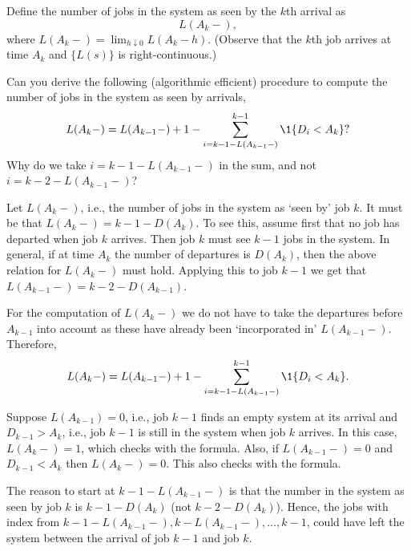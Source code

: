 \begin{exercise} 
Define the number of jobs in the system as seen by the $k$th arrival  as
\begin{equation}
  \label{eq:Lk}
  L(A_k-),
\end{equation}
where $L(A_k-) = \lim_{h\downarrow 0} L(A_k - h)$. (Observe that the $k$th job arrives at time $A_k$ and $\{L(s)\}$ is right-continuous.)

Can you derive the following (algorithmic efficient) procedure to
    compute the number of jobs in the system as seen by arrivals,
  \begin{equation*}
    L(A_k-) = L(A_{k-1}-)+1 - \sum_{i= k-1 - L(A_{k-1}-)}^{k-1} \1{D_i< A_k}?
  \end{equation*} Why do we take $i=k-1-L(A_{k-1}-)$ in  the sum, and not $i=k-2-L(A_{k-1}-)$?
\begin{solution}
  Let $ L(A_{k}-)$, i.e., the number of jobs in the system as
  `seen by' job $k$. It must be that $L(A_{k}-)=k-1 - D(A_{k})$. To see
  this, assume first that no job has departed when job $k$
  arrives. Then job $k$ must see $k-1$ jobs in the system. In general,
  if at time $A_k$ the number of departures is $D(A_k)$, then the
  above relation for $L(A_k-)$ must hold. Applying this to job $k-1$ we get that $L(A_{k-1}-) = k-2 - D(A_{k-1})$. 

  For the computation of $L(A_k-)$ we do not have to take the departures
  before $A_{k-1}$ into account as these have already been
  `incorporated in' $L(A_{k-1}-)$.  Therefore,
  \begin{equation*}
    L(A_k-) = L(A_{k-1}-) + 1 - \sum_{i= k-1 - L(A_{k-1}-)}^{k-1} \1{D_i< A_k}.
  \end{equation*}

    Suppose $L(A_{k-1})=0$, i.e., job $k-1$ finds an empty system at its
    arrival and $D_{k-1}>A_{k}$, i.e., job $k-1$ is still in the
    system when job $k$ arrives. In this case, $L(A_{k}-)=1$, which checks
    with the formula.  Also, if $L(A_{k-1}-)=0$ and $D_{k-1}< A_k$ then
    $L(A_k-) = 0$. This also checks with the formula. 

    The reason to start at $k-1-L(A_{k-1}-)$ is that the number in the
    system as seen by job $k$ is $k-1 - D(A_k)$ (not
    $k-2-D(A_k)$). Hence, the jobs with index from
    $k-1-L(A_{k-1}-), k-L(A_{k-1}-), \ldots, k-1$, could have left the system
    between the arrival of job $k-1$ and job $k$.
\end{solution}
\end{exercise}


